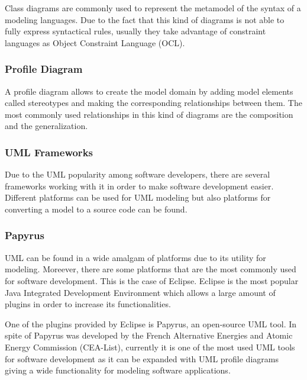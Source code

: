 Class diagrams are commonly used to represent the metamodel of the syntax of a modeling languages. Due to the fact that this kind of diagrams is not able to fully express syntactical rules, usually they take advantage of constraint languages as Object Constraint Language (OCL).

\subsubsection*{Profile Diagram}

A profile diagram allows to create the model domain by adding model elements called stereotypes and making the corresponding relationships between them. The most commonly used relationships in this kind of diagrams are the composition and the generalization.


\subsubsection{UML Frameworks}

Due to the UML popularity among software developers, there are several frameworks working with it in order to make software development easier. Different platforms can be used for UML modeling but also platforms for converting a model to a source code can be found.

\subsubsection*{Papyrus}

UML can be found in a wide amalgam of platforms due to its utility for modeling. Moreever, there are some platforms that are the most commonly used for software development. This is the case of Eclipse.  Eclipse is the most popular Java Integrated Development Environment which allows a large amount of plugins in order to increase its functionalities.

One of the plugins provided by Eclipse is Papyrus, an open-source UML tool. In spite of Papyrus was developed by the French Alternative Energies and Atomic Energy Commission (CEA-List), currently it is one of the most used UML tools for software development as it can be expanded with UML profile diagrams giving a wide functionality for modeling software applications.

